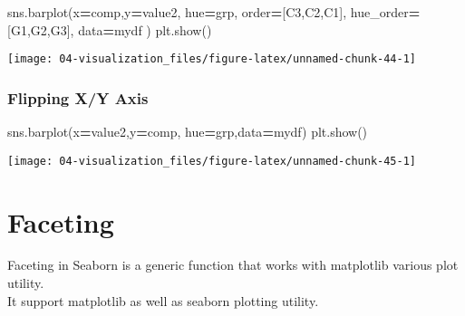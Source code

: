 \documentclass[
]{book}
\newenvironment{Shaded}{\begin{snugshade}}{\end{snugshade}}
\newcommand{\NormalTok}[1]{#1}
\newcommand{\OperatorTok}[1]{\textcolor[rgb]{0.43,0.43,0.43}{\textbf{#1}}}
\newcommand{\StringTok}[1]{\textcolor[rgb]{0.5,0.5,0.5}{#1}}
\begin{document}
\begin{Shaded}
\begin{Highlighting}[]
\NormalTok{sns.barplot(x}\OperatorTok{=}\StringTok{\textquotesingle{}comp\textquotesingle{}}\NormalTok{,y}\OperatorTok{=}\StringTok{\textquotesingle{}value2\textquotesingle{}}\NormalTok{, hue}\OperatorTok{=}\StringTok{\textquotesingle{}grp\textquotesingle{}}\NormalTok{,}
\NormalTok{            order}\OperatorTok{=}\NormalTok{[}\StringTok{\textquotesingle{}C3\textquotesingle{}}\NormalTok{,}\StringTok{\textquotesingle{}C2\textquotesingle{}}\NormalTok{,}\StringTok{\textquotesingle{}C1\textquotesingle{}}\NormalTok{],}
\NormalTok{            hue\_order}\OperatorTok{=}\NormalTok{[}\StringTok{\textquotesingle{}G1\textquotesingle{}}\NormalTok{,}\StringTok{\textquotesingle{}G2\textquotesingle{}}\NormalTok{,}\StringTok{\textquotesingle{}G3\textquotesingle{}}\NormalTok{],}
\NormalTok{            data}\OperatorTok{=}\NormalTok{mydf}
\NormalTok{)}
\NormalTok{plt.show()}
\end{Highlighting}
\end{Shaded}

\texttt{[image: 04-visualization\_files/figure-latex/unnamed-chunk-44-1]}

\hypertarget{flipping-xy-axis}{%
\subsubsection{Flipping X/Y Axis}\label{flipping-xy-axis}}

\begin{Shaded}
\begin{Highlighting}[]
\NormalTok{sns.barplot(x}\OperatorTok{=}\StringTok{\textquotesingle{}value2\textquotesingle{}}\NormalTok{,y}\OperatorTok{=}\StringTok{\textquotesingle{}comp\textquotesingle{}}\NormalTok{, hue}\OperatorTok{=}\StringTok{\textquotesingle{}grp\textquotesingle{}}\NormalTok{,data}\OperatorTok{=}\NormalTok{mydf)}
\NormalTok{plt.show()}
\end{Highlighting}
\end{Shaded}

\texttt{[image: 04-visualization\_files/figure-latex/unnamed-chunk-45-1]}

\hypertarget{faceting}{%
\section{Faceting}\label{faceting}}

Faceting in Seaborn is a generic function that works with matplotlib various plot utility.\\
It support matplotlib as well as seaborn plotting utility.
\end{document}
